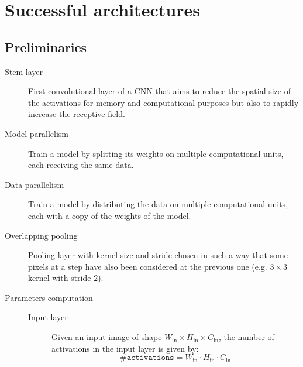 \chapter{Successful architectures}


\section{Preliminaries}

\begin{description}
    \item[Stem layer] 
        First convolutional layer of a CNN that aims to reduce the spatial size of the activations for memory and computational purposes
        but also to rapidly increase the receptive field.

    \item[Model parallelism] 
        Train a model by splitting its weights on multiple computational units, each receiving the same data.

    \item[Data parallelism] 
        Train a model by distributing the data on multiple computational units, each with a copy of the weights of the model.

    \item[Overlapping pooling] 
        Pooling layer with kernel size and stride chosen in such a way that
        some pixels at a step have also been considered at the previous one (e.g. $3 \times 3$ kernel with stride $2$).

    \item[Parameters computation] 
        \phantom{}
        \begin{description}
            \item[Input layer]
                Given an input image of shape $W_\text{in} \times H_\text{in} \times C_\text{in}$,
                the number of activations in the input layer is given by:
                \[ \texttt{\#activations} = W_\text{in} \cdot H_\text{in} \cdot C_\text{in} \]



\end{description}
\end{description}
